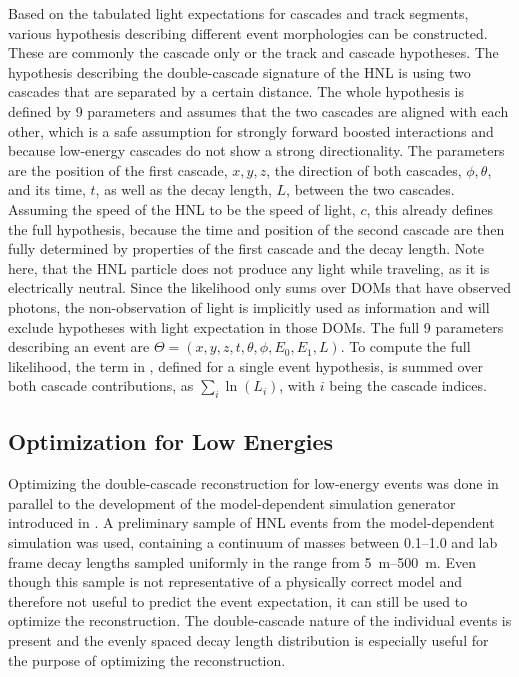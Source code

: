 Based on the tabulated light expectations for cascades and track segments, various hypothesis describing different event morphologies can be constructed. These are commonly the cascade only or the track and cascade hypotheses. The hypothesis describing the double-cascade signature of the HNL is using two cascades that are separated by a certain distance. The whole hypothesis is defined by 9 parameters and assumes that the two cascades are aligned with each other, which is a safe assumption for strongly forward boosted interactions and because low-energy cascades do not show a strong directionality. The parameters are the position of the first cascade, $x, y, z$, the direction of both cascades, $\phi, \theta$, and its time, $t$, as well as the decay length, $L$, between the two cascades. Assuming the speed of the HNL to be the speed of light, $c$, this already defines the full hypothesis, because the time and position of the second cascade are then fully determined by properties of the first cascade and the decay length. Note here, that the HNL particle does not produce any light while traveling, as it is electrically neutral. Since the likelihood only sums over DOMs that have observed photons, the non-observation of light is implicitly used as information and will exclude hypotheses with light expectation in those DOMs. The full 9 parameters describing an event are $\Theta = (x, y, z, t, \theta, \phi, E_0, E_1, L)$. To compute the full likelihood, the term in , defined for a single event hypothesis, is summed over both cascade contributions, as $\sum_i \ln(L_i)$, with $i$ being the cascade indices.


\subsection{Optimization for Low Energies}

Optimizing the double-cascade reconstruction for low-energy events was done in parallel to the development of the model-dependent simulation generator introduced in . A preliminary sample of HNL events from the model-dependent simulation was used, containing a continuum of masses between \SIrange[range-phrase=~and~]{0.1}{1.0}{\gev} and lab frame decay lengths sampled uniformly in the range from \SIrange{5}{500}{\meter}. Even though this sample is not representative of a physically correct model and therefore not useful to predict the event expectation, it can still be used to optimize the reconstruction. The double-cascade nature of the individual events is present and the evenly spaced decay length distribution is especially useful for the purpose of optimizing the reconstruction.


